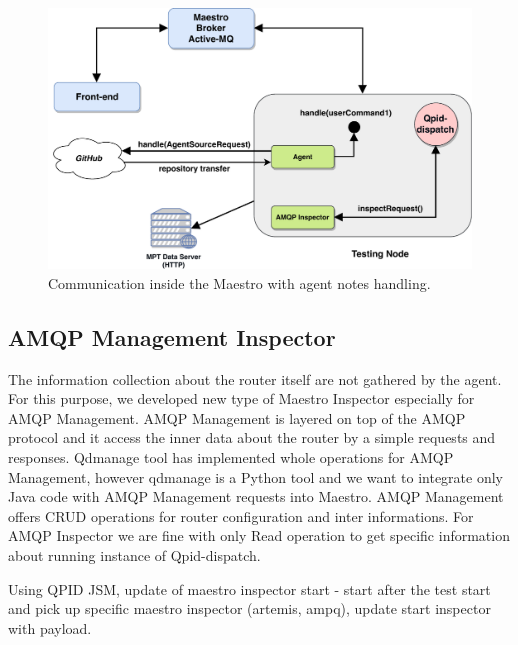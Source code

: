 \begin{figure}[H]
  \centering
  \includegraphics[width=13cm]{obrazky-figures/agent_demo.pdf}
  \caption{Communication inside the Maestro with agent notes handling.}
  \label{fig:agent_demo}
\end{figure}


\subsection{AMQP Management Inspector}
\label{AMQP Management Inspector}
The information collection about the router itself are not gathered by the agent. For this purpose, we developed new type of Maestro Inspector especially for AMQP Management. AMQP Management is layered on top of the AMQP protocol and it access the inner data about the router by a simple requests and responses. Qdmanage tool has implemented whole operations for AMQP Management, however qdmanage is a Python tool and we want to integrate only Java code with AMQP Management requests into Maestro. AMQP Management offers CRUD operations for router configuration and inter informations. For AMQP Inspector we are fine with only Read operation to get specific information about running instance of Qpid-dispatch.



Using QPID JSM, update of maestro inspector start - start after the test start and pick up specific maestro inspector (artemis, ampq), update start inspector with payload.

